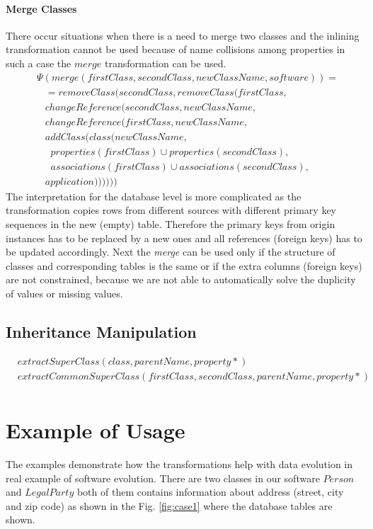 \documentclass[runningheads]{comsis}
\begin{document}
\paragraph{Merge Classes}
There occur situations when there is a need to merge two classes and the inlining transformation cannot be used because of name collisions among properties in such a case the $merge$ transformation can be used. \begin{align}
& \Psi(merge(firstClass, secondClass, newClassName, software)) = \nonumber \\
& \; \; \; = removeClass(secondClass, removeClass(firstClass,\nonumber  \\
& \; \; \; changeReference(secondClass, newClassName, \nonumber \\
& \; \; \; changeReference(firstClass, newClassName,\nonumber  \\
& \; \; \; addClass(class(newClassName, \nonumber  \\
& \; \; \; \; \;properties(firstClass) \cup properties(secondClass), \nonumber  \\
& \; \; \;\; \;associations(firstClass) \cup associations(secondClass), \nonumber  \\
& \; \; \;application)))))) 
\end{align}
The interpretation for the database level is more complicated as the transformation copies rows from different sources with different primary key sequences in the new (empty) table. Therefore the primary keys from origin instances has to be replaced by a new ones and all references (foreign keys) has to be updated accordingly. Next the \emph{merge} can be used only if the structure of classes and corresponding tables is the same or if the extra columns (foreign keys) are not constrained, because we are not able to automatically solve the  duplicity of values or missing values.

\subsection{Inheritance Manipulation}
\begin{align}
& extractSuperClass(class, parentName, property*) \\
  & extractCommonSuperClass(firstClass, secondClass, parentName,  property* ) \\
\end{align}


\section{Example of Usage}
The examples demonstrate how the transformations help with data evolution in real example of software evolution. There are two classes in our software $Person$ and $LegalParty$ both of them contains information about address (street, city and zip code) as shown in the Fig. \ref{fig:case1} where the database tables are shown. 
\end{document}
